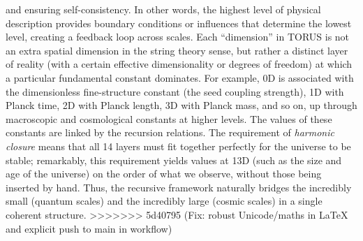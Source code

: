 \documentclass[]{article}
\begin{document}
and ensuring self-consistency​. In other words, the highest level of
physical description provides boundary conditions or influences that
determine the lowest level, creating a feedback loop across scales. Each
``dimension'' in TORUS is not an extra spatial dimension in the string
theory sense, but rather a distinct layer of reality (with a certain
effective dimensionality or degrees of freedom) at which a particular
fundamental constant dominates. For example, 0D is associated with the
dimensionless fine-structure constant \alpha (the seed coupling strength), 1D
with Planck time, 2D with Planck length, 3D with Planck mass, and so on,
up through macroscopic and cosmological constants at higher levels​. The
values of these constants are linked by the recursion relations. The
requirement of \emph{harmonic closure} means that all 14 layers must fit
together perfectly for the universe to be stable; remarkably, this
requirement yields values at 13D (such as the size and age of the
universe) on the order of what we observe, without those being inserted
by hand​. Thus, the recursive framework naturally bridges the incredibly
small (quantum scales) and the incredibly large (cosmic scales) in a
single coherent structure.
>>>>>>> 5d40795 (Fix: robust Unicode/maths in LaTeX and explicit push to main in workflow)
\end{document}
